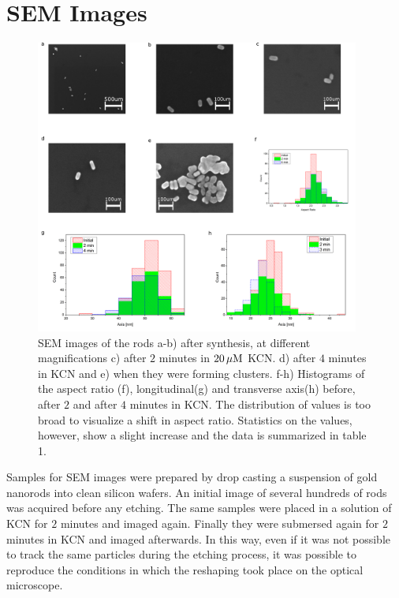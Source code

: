 \newpage

\section{SEM Images}

\begin{figure}[tp]
 \centering
 \includegraphics[width=0.95\textwidth]{Chapters/02_KCN/Figures/04_Supporting/02_SEM/sem.png}
 \caption{SEM images of the rods a-b) after synthesis, at different
 magnifications c) after $2$ minutes in $20\,\mu\textrm{M}$ KCN. d) after $4$ minutes in KCN
 and e) when they were forming clusters. f-h) Histograms of the aspect ratio
 (f), longitudinal(g) and transverse axis(h) before, after $2$ and after $4$
 minutes in KCN. The distribution of values is too broad to visualize a shift in
 aspect ratio.
 Statistics on the values, however, show a slight increase and the data is
 summarized in table 1. }
 \label{fig:SEM}
\end{figure}

Samples for SEM images were prepared by drop casting a suspension of gold
nanorods into clean silicon wafers. An initial image of several hundreds of rods
was acquired before any etching. The same samples were placed in a solution of KCN
for $2$ minutes and imaged again. Finally they were submersed again for $2$
minutes in KCN and imaged afterwards. In this way, even if it was not possible
to track the same particles during the etching process, it was possible to
reproduce the conditions in which the reshaping took place on the optical
microscope.

